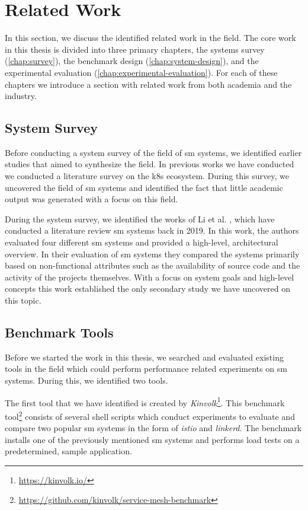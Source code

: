 \section{Related Work}
\label{sec:background:related-work}

In this section, we discuss the identified related work in the field. The core work in this thesis is divided into three primary chapters, the systems survey (\cref{chap:survey}), the benchmark design (\cref{chap:system-design}), and the experimental evaluation (\cref{chap:experimental-evaluation}). For each of these chapters we introduce a section with related work from both academia and the industry.

\subsection{System Survey}
\label{sec:background:related-work:survey}

Before conducting a system survey of the field of \gls{sm} systems, we identified earlier studies that aimed to synthesize the field. In previous works we have conducted we conducted a literature survey on the \gls{k8s} ecosystem. During this survey, we uncovered the field of \gls{sm} systems and identified the fact that little academic output was generated with a focus on this field. 

During the system survey, we identified the works of Li et al. \cite{service-mesh-survey}, which have conducted a literature review \gls{sm} systems back in 2019. In this work, the authors evaluated four different \gls{sm} systems and provided a high-level, architectural overview. In their evaluation of \gls{sm} systems they compared the systems primarily based on non-functional attributes such as the availability of source code and the activity of the projects themselves. With a focus on system goals and high-level concepts this work established the only secondary study we have uncovered on this topic. 


\subsection{Benchmark Tools}
\label{sec:background:related-work:benchmark}

Before we started the work in this thesis, we searched and evaluated existing tools in the field which could perform performance related experiments on \gls{sm} systems. During this, we identified two tools.

The first tool that we have identified is created by  \textit{Kinvolk}\footnote{\url{https://kinvolk.io/}}. This benchmark tool\footnote{\url{https://github.com/kinvolk/service-mesh-benchmark}} consists of several shell scripts which conduct experiments to evaluate and compare two popular \gls{sm} systems in the form of \textit{istio} and \textit{linkerd}. The benchmark installs one of the previously mentioned \gls{sm} systems and performs load tests on a predetermined, sample application.

